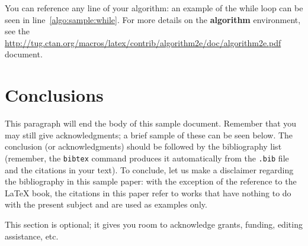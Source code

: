 \documentclass[sigconf]{acmart}
\begin{document}
You can reference any line of your algorithm: an example of the while loop can
be seen in line~\ref{algo:sample:while}.  For more details on the \textbf{algorithm}
environment, see the
\url{http://tug.ctan.org/macros/latex/contrib/algorithm2e/doc/algorithm2e.pdf}
document.

\section{Conclusions}

This paragraph will end the body of this sample document.  Remember that you
may still give acknowledgments; a brief sample of these can be seen below.
The conclusion (or acknowledgments) should be followed by the bibliography
list (remember, the \texttt{bibtex} command produces it automatically from the
\texttt{.bib} file and the citations in your text).  To conclude, let us make
a disclaimer regarding the bibliography in this sample paper: with the
exception of the reference to the \LaTeX{} book, the citations in this paper
refer to works that have nothing to do with the present subject and are
used as examples only.

\begin{acks}
    This section is optional; it gives you room to acknowledge grants,
    funding, editing assistance, etc.
\end{acks}



\end{document}
